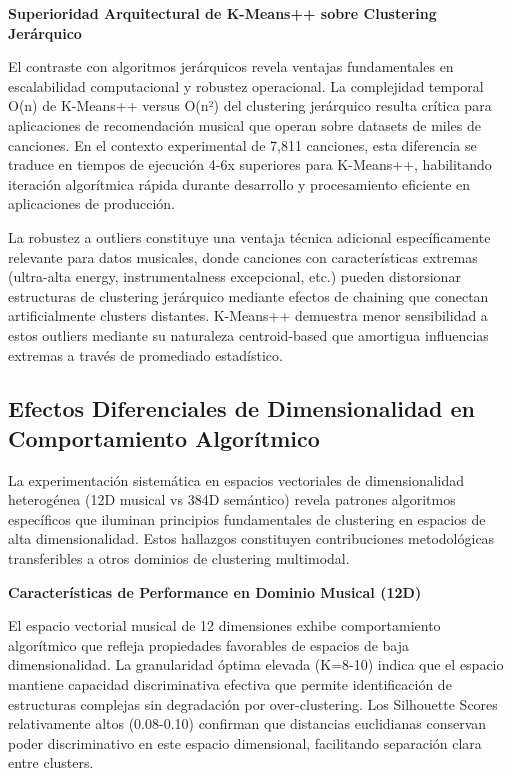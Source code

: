 \documentclass[12pt,a4paper]{report}
\begin{document}
\textbf{Superioridad Arquitectural de K-Means++ sobre Clustering Jerárquico}

El contraste con algoritmos jerárquicos revela ventajas fundamentales en escalabilidad computacional y robustez operacional. La complejidad temporal O(n) de K-Means++ versus O(n²) del clustering jerárquico resulta crítica para aplicaciones de recomendación musical que operan sobre datasets de miles de canciones. En el contexto experimental de 7,811 canciones, esta diferencia se traduce en tiempos de ejecución 4-6x superiores para K-Means++, habilitando iteración algorítmica rápida durante desarrollo y procesamiento eficiente en aplicaciones de producción.

La robustez a outliers constituye una ventaja técnica adicional específicamente relevante para datos musicales, donde canciones con características extremas (ultra-alta energy, instrumentalness excepcional, etc.) pueden distorsionar estructuras de clustering jerárquico mediante efectos de chaining que conectan artificialmente clusters distantes. K-Means++ demuestra menor sensibilidad a estos outliers mediante su naturaleza centroid-based que amortigua influencias extremas a través de promediado estadístico.

\subsection{Efectos Diferenciales de Dimensionalidad en Comportamiento Algorítmico}

La experimentación sistemática en espacios vectoriales de dimensionalidad heterogénea (12D musical vs 384D semántico) revela patrones algoritmos específicos que iluminan principios fundamentales de clustering en espacios de alta dimensionalidad. Estos hallazgos constituyen contribuciones metodológicas transferibles a otros dominios de clustering multimodal.

\textbf{Características de Performance en Dominio Musical (12D)}

El espacio vectorial musical de 12 dimensiones exhibe comportamiento algorítmico que refleja propiedades favorables de espacios de baja dimensionalidad. La granularidad óptima elevada (K=8-10) indica que el espacio mantiene capacidad discriminativa efectiva que permite identificación de estructuras complejas sin degradación por over-clustering. Los Silhouette Scores relativamente altos (0.08-0.10) confirman que distancias euclidianas conservan poder discriminativo en este espacio dimensional, facilitando separación clara entre clusters.
\end{document}
